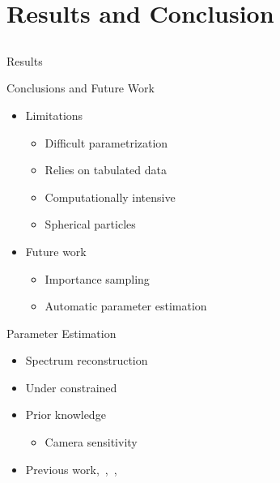 \documentclass{beamer}
\begin{document}
\section{Results and Conclusion}
\subsection{ }

\begin{frame}{Results}

\end{frame}

\begin{frame}{Conclusions and Future Work}

\begin{itemize}
\setlength\itemsep{0.5em}
\item Limitations
	\begin{itemize}
	\setlength\itemsep{0.5em}
	\item Difficult parametrization
	\item Relies on tabulated data
	\item Computationally intensive
	\item Spherical particles
	\end{itemize}
\item Future work
	\begin{itemize}
	\setlength\itemsep{0.5em}
	\item Importance sampling
	\item Automatic parameter estimation
	\end{itemize}
\end{itemize}

\end{frame}

\begin{frame}{Parameter Estimation}

\begin{itemize}
\setlength\itemsep{0.5em}
\item Spectrum reconstruction
\item Under constrained
\item Prior knowledge
	\begin{itemize}
	\setlength\itemsep{0.5em}
	\item Camera sensitivity
	\end{itemize}
\item Previous work,~\cite{Smits:1999},~\cite{Sun2001},~\cite{Drew:2003}
\end{itemize}

\end{frame}
\end{document}
